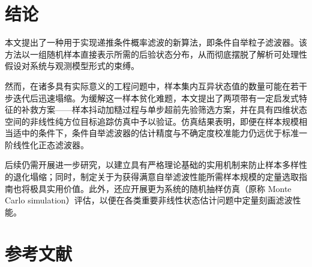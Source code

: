 \section{结论}\label{sec:conc}

本文提出了一种用于实现递推条件概率滤波的新算法，即条件自举粒子滤波器。该方法以一组随机样本直接表示所需的后验状态分布，从而彻底摆脱了解析可处理性假设对系统与观测模型形式的束缚。

然而，在诸多具有实际意义的工程问题中，样本集内互异状态值的数量可能在若干步迭代后迅速塌缩。为缓解这一样本贫化难题，本文提出了两项带有一定启发式特征的补救方案——样本抖动加糙过程与单步超前先验筛选方案，并在具有四维状态空间的非线性纯方位目标追踪仿真中予以验证。仿真结果表明，即便在样本规模相当适中的条件下，条件自举滤波器的估计精度与不确定度校准能力仍远优于标准一阶线性化正态滤波器。

后续仍需开展进一步研究，以建立具有严格理论基础的实用机制来防止样本多样性的退化塌缩；同时，制定关于为获得满意自举滤波性能所需样本规模的定量选取指南也将极具实用价值。此外，还应开展更为系统的随机抽样仿真（原称 Monte Carlo simulation）评估，以便在各类重要非线性状态估计问题中定量刻画滤波性能。

\section{参考文献}\label{sec:refs}





